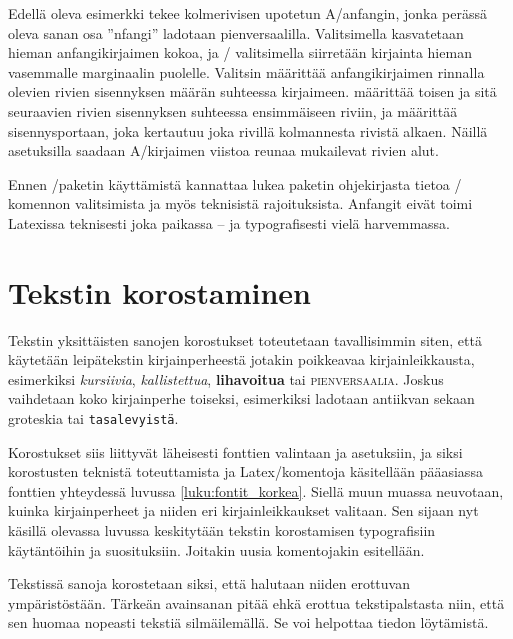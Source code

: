 Edellä oleva esimerkki tekee kolmerivisen upotetun A\-/anfangin, jonka
perässä oleva sanan osa ''nfangi'' ladotaan pienversaalilla.
Valitsimella  kasvatetaan hieman anfangikirjaimen
kokoa, ja \-/ valitsimella siirretään kirjainta hieman
vasemmalle marginaalin puolelle. Valitsin  määrittää
anfangikirjaimen rinnalla olevien rivien sisennyksen määrän suhteessa
kirjaimeen.  määrittää toisen ja sitä seuraavien rivien
sisennyksen suhteessa ensimmäiseen riviin, ja  määrittää
sisennysportaan, joka kertautuu joka rivillä kolmannesta rivistä alkaen.
Näillä asetuksilla saadaan A\-/kirjaimen viistoa reunaa mukailevat
rivien alut.

Ennen \-/paketin käyttämistä kannattaa lukea paketin
ohjekirjasta tietoa \-/ komennon valitsimista ja myös
teknisistä rajoituksista. Anfangit eivät toimi Latexissa teknisesti joka
paikassa -- ja typografisesti vielä harvemmassa.

\section{Tekstin korostaminen}
\label{luku:korostus}

Tekstin yksittäisten sanojen korostukset toteutetaan tavallisimmin
siten, että käytetään leipätekstin kirjainperheestä jotakin poikkeavaa
kirjainleikkausta, esimerkiksi \textit{kursiivia},
\textsl{kallistettua}, \textbf{lihavoitua} tai \textsc{pienversaalia}.
Joskus vaihdetaan koko kirjainperhe toiseksi, esimerkiksi ladotaan
\textrm{antiikvan} sekaan \textsf{groteskia} tai \texttt{tasalevyistä}.

Korostukset siis liittyvät läheisesti fonttien valintaan ja asetuksiin,
ja siksi korostusten teknistä toteuttamista ja Latex\-/komentoja
käsitellään pääasiassa fonttien yhteydessä luvussa
\ref{luku:fontit_korkea}.  Siellä muun muassa neuvotaan,
kuinka kirjainperheet ja niiden eri kirjainleikkaukset valitaan. Sen
sijaan nyt käsillä olevassa luvussa keskitytään tekstin korostamisen
typografisiin käytäntöihin ja suosituksiin. Joitakin uusia komentojakin
esitellään.

Tekstissä sanoja korostetaan siksi, että halutaan niiden erottuvan
ympäristöstään. Tärkeän avainsanan pitää ehkä erottua tekstipalstasta
niin, että sen huomaa nopeasti tekstiä silmäilemällä. Se voi helpottaa
tiedon löytämistä.

